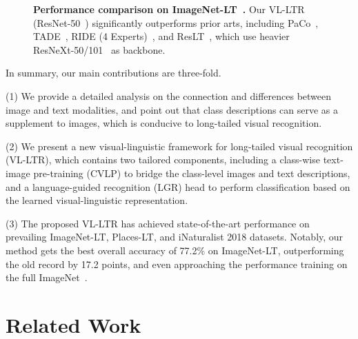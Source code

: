 \documentclass[runningheads]{llncs}
\begin{document}
\begin{wrapfigure}{r}{0.59\textwidth}
\begin{center}
    \setlength{\fboxrule}{0pt}
    	\end{center}
\caption{
    \textbf{Performance comparison on ImageNet-LT~\cite{liu2019large}.} Our VL-LTR (ResNet-50~\cite{he2016deep}) significantly outperforms prior arts, including PaCo~\cite{cui2021parametric}, TADE~\cite{zhang2021test}, RIDE (4 Experts)~\cite{wang2020long}, and ResLT~\cite{cui2021reslt}, which use heavier ResNeXt-50/101~\cite{xie2017aggregated} as backbone.
    }
    \label{fig:res_intro}
\end{wrapfigure}



In summary, our main contributions are three-fold.

(1) We provide a detailed analysis on the connection and differences between image and text modalities, and point out that class descriptions can serve as a supplement to images, which is conducive to long-tailed visual recognition.

(2) We present a new visual-linguistic framework for long-tailed visual recognition (VL-LTR), which contains two tailored components, including a class-wise text-image pre-training (CVLP) to bridge the class-level images and text descriptions, and a language-guided recognition (LGR) head to perform classification based on the learned visual-linguistic representation.

(3) The proposed VL-LTR has achieved state-of-the-art performance on prevailing ImageNet-LT, Places-LT, and iNaturalist 2018 datasets. Notably, our method gets the best overall accuracy of 77.2\% on ImageNet-LT, outperforming the old record by 17.2 points, and even approaching the performance training on the full ImageNet~\cite{deng2009imagenet}.

\section{Related Work}
\end{document}
